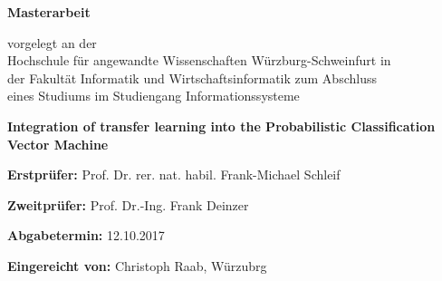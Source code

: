 \begin{titlepage}
\vspace*{2cm}
\centering 
	{\Huge\bfseries Masterarbeit\par}
	\vspace{1.5cm}
	{vorgelegt an der\\
		Hochschule für angewandte Wissenschaften Würzburg-Schweinfurt in\\
		der Fakultät Informatik und Wirtschaftsinformatik zum Abschluss\\
		eines Studiums im Studiengang Informationssysteme
	\par}
	\vspace{2.5cm}
	{\Large\bfseries Integration of transfer learning into the Probabilistic Classification Vector Machine \par}
	\vspace{2cm}

\raggedright
	\vfill
	\textbf{Erstprüfer:} Prof. Dr. rer. nat. habil. Frank-Michael Schleif\par
	\textbf{Zweitprüfer:} Prof. Dr.-Ing. Frank Deinzer\par
	\textbf{Abgabetermin:} 12.10.2017\par
	
\raggedleft
	\vfill
	\textbf{Eingereicht von:} Christoph Raab, Würzubrg\par
	
\end{titlepage}